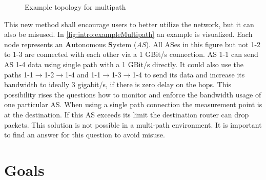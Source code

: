 \documentclass[thesis.tex]{subfiles}
\begin{document}
\begin{figure}[h]
    \centering
    \caption{Example topology for multipath}
    \label{fig:intro:exampleMultipath}
\end{figure}

This new method shall encourage users to better utilize the network, but it can also be misused. In \autoref{fig:intro:exampleMultipath} an example is visualized. Each node represents an \textbf{A}utonomous \textbf{S}ystem (\textit{AS}). All ASes in this figure but not 1-2 to 1-3 are connected with each other via a 1 GBit/s connection. AS 1-1 can send AS 1-4 data using single path with a 1 GBit/s directly. It could also use the paths 1-1$\rightarrow$1-2$\rightarrow$1-4 and 1-1$\rightarrow$1-3$\rightarrow$1-4 to send its data and increase its bandwidth to ideally 3 gigabit/s, if there is zero delay on the hops. This possibility rises the questions how to monitor and enforce the bandwidth usage of one particular AS. When using a single path connection the measurement point is at the destination. If this AS exceeds its limit the destination router can drop packets. This solution is not possible in a multi-path environment. It is important to find an answer for this question to avoid misuse.

\section{Goals} \label{sec:intro:goals}
\end{document}
